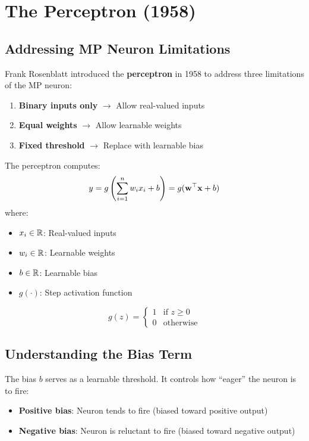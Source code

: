 \section{The Perceptron (1958)}

\subsection{Addressing MP Neuron Limitations}

Frank Rosenblatt introduced the \textbf{perceptron} in 1958 to address three limitations of the MP neuron:

\begin{enumerate}
    \item \textbf{Binary inputs only} $\rightarrow$ Allow real-valued inputs
    \item \textbf{Equal weights} $\rightarrow$ Allow learnable weights
    \item \textbf{Fixed threshold} $\rightarrow$ Replace with learnable bias
\end{enumerate}

\begin{definitionbox}
The perceptron computes:
\[
y = g\left(\sum_{i=1}^{n} w_i x_i + b\right) = g(\mathbf{w}^\top \mathbf{x} + b)
\]
where:
\begin{itemize}
    \item $x_i \in \mathbb{R}$: Real-valued inputs
    \item $w_i \in \mathbb{R}$: Learnable weights
    \item $b \in \mathbb{R}$: Learnable bias
    \item $g(\cdot)$: Step activation function
\end{itemize}
\[
g(z) = \begin{cases} 1 & \text{if } z \geq 0 \\ 0 & \text{otherwise} \end{cases}
\]
\end{definitionbox}

\subsection{Understanding the Bias Term}

The bias $b$ serves as a learnable threshold. It controls how ``eager'' the neuron is to fire:

\begin{itemize}
    \item \textbf{Positive bias}: Neuron tends to fire (biased toward positive output)
    \item \textbf{Negative bias}: Neuron is reluctant to fire (biased toward negative output)
\end{itemize}


